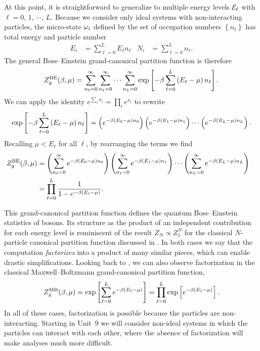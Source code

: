 At this point, it is straightforward to generalize to multiple energy levels $\mathcal E_{\ell}$ with $\ell = 0$, $1$, $\cdots$, $L$.
Because we consider only ideal systems with non-interacting particles, the micro-state $\omega_i$ defined by the set of occupation numbers $\left\{n_{\ell}\right\}$ has total energy and particle number
\begin{align}
  \label{eq:total_energy_levels}
  E_i & = \sum_{\ell = 0}^L E_{\ell} n_{\ell} &
  N_i & = \sum_{\ell = 0}^L n_{\ell}.
\end{align}
The general Bose--Einstein grand-canonical partition function is therefore
\begin{equation*}
  Z_g^{\text{BE}}(\beta, \mu) = \sum_{n_0 = 0}^{\infty} \sum_{n_1 = 0}^{\infty} \cdots \sum_{n_L = 0}^{\infty} \exp\left[-\beta\sum_{\ell = 0}^L \left(E_{\ell} - \mu\right) n_{\ell}\right].
\end{equation*}
We can apply the identity $e^{\sum_i x_i} = \prod_i e^{x_i}$ to rewrite
\begin{equation*}
  \exp\left[-\beta\sum_{\ell = 0}^L \left(E_{\ell} - \mu\right) n_{\ell}\right] = \left(e^{-\beta (E_0 - \mu) n_0}\right) \left(e^{-\beta (E_1 - \mu) n_1}\right)\cdots \left(e^{-\beta (E_L - \mu) n_L}\right).
\end{equation*}
Recalling $\mu < E_{\ell}$ for all $\ell$, by rearranging the terms we find
\begin{align}
  Z_g^{\text{BE}}(\beta, \mu) & = \left(\sum_{n_0 = 0}^{\infty} e^{-\beta (E_0 - \mu) n_0}\right) \left(\sum_{n_1 = 0}^{\infty} e^{-\beta (E_1 - \mu) n_1}\right)\cdots \left(\sum_{n_L = 0}^{\infty} e^{-\beta (E_L - \mu) n_L}\right) \cr
                 & = \prod_{\ell = 0}^L \frac{1}{1 - e^{-\beta (E_{\ell} - \mu)}}. \label{eq:partfunc_BE}
\end{align}

This grand-canonical partition function defines the quantum Bose--Einstein statistics of bosons.
Its structure as the product of an independent contribution for each energy level is reminiscent of the result $Z_N \propto Z_1^N$ for the classical $N$-particle canonical partition function discussed in .
In both cases we say that the computation \textit{factorizes} into a product of many similar pieces, which can enable drastic simplifications.
Looking back to , we can also observe factorization in the classical Maxwell--Boltzmann grand-canonical partition function,
\begin{equation}
  \label{eq:partfunc_MB}
  Z_g^{\text{MB}}(\beta, \mu) = \exp\left[\sum_{\ell = 0}^L e^{-\beta\left(E_{\ell} - \mu\right)}\right] = \prod_{\ell = 0}^L \exp\left[e^{-\beta\left(E_{\ell} - \mu\right)}\right].
\end{equation}
In all of these cases, factorization is possible because the particles are non-interacting.
Starting in Unit~9 we will consider non-ideal systems in which the particles can interact with each other, where the absence of factorization will make analyses much more difficult.



